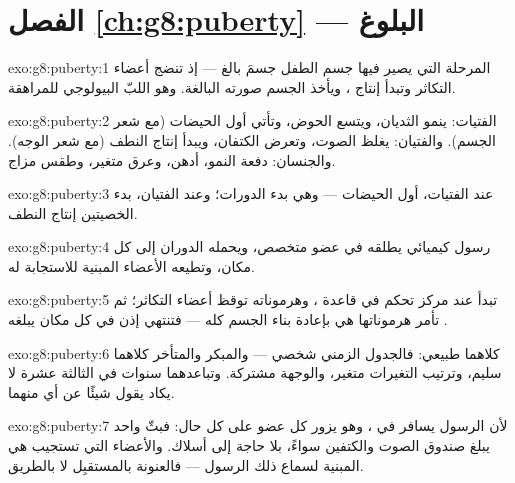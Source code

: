 \section*{الفصل \ref{ch:g8:puberty} --- البلوغ}

\begin{solution}{exo:g8:puberty:1}
المرحلة التي يصير فيها جسم الطفل جسمَ بالغ --- إذ تنضج أعضاء
التكاثر وتبدأ إنتاج ، ويأخذ الجسم صورته البالغة. وهو اللبّ
البيولوجي للمراهقة.
\end{solution}

\begin{solution}{exo:g8:puberty:2}
الفتيات: ينمو الثديان، ويتسع الحوض، وتأتي أول الحيضات (مع شعر
الجسم). والفتيان: يغلظ الصوت، وتعرض الكتفان، ويبدأ إنتاج النطف (مع
شعر الوجه). والجنسان: دفعة النمو،  أدهن، وعرق متغير، وطقس
مزاج.
\end{solution}

\begin{solution}{exo:g8:puberty:3}
عند الفتيات، أول الحيضات --- وهي بدء الدورات؛ وعند الفتيان، بدء
الخصيتين إنتاج النطف.
\end{solution}

\begin{solution}{exo:g8:puberty:4}
رسول كيميائي يطلقه في  عضو متخصص، ويحمله الدوران إلى كل مكان،
وتطيعه الأعضاء المبنية للاستجابة له.
\end{solution}

\begin{solution}{exo:g8:puberty:5}
تبدأ عند مركز تحكم في قاعدة ، وهرموناته توقظ أعضاء التكاثر؛
ثم تأمر هرموناتها هي بإعادة بناء الجسم كله --- فتنتهي إذن في كل
مكان يبلغه .
\end{solution}

\begin{solution}{exo:g8:puberty:6}
كلاهما طبيعي: فالجدول الزمني شخصي --- والمبكر والمتأخر كلاهما
سليم، وترتيب التغيرات متغير، والوجهة مشتركة. وتباعدهما سنوات في
الثالثة عشرة لا يكاد يقول شيئًا عن أي منهما.
\end{solution}

\begin{solution}{exo:g8:puberty:7}
لأن الرسول يسافر في ، وهو يزور كل عضو على كل حال: فبثّ واحد
يبلغ صندوق الصوت والكتفين  سواءً، بلا حاجة إلى أسلاك.
والأعضاء التي تستجيب هي المبنية لسماع ذلك الرسول --- فالعنونة
بالمستقبِل لا بالطريق.
\end{solution}

